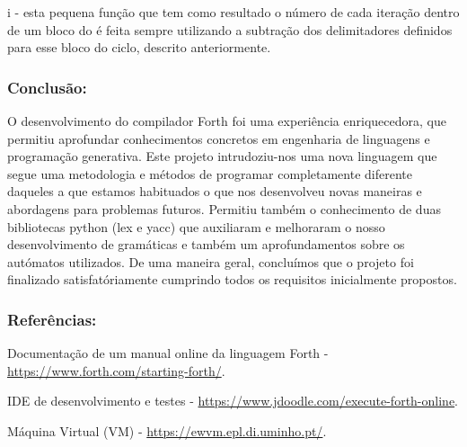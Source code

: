 \documentclass{article}
\begin{document}
    i - esta pequena função que tem como resultado o número de cada iteração dentro de um bloco do é feita sempre utilizando a subtração dos delimitadores definidos para esse bloco do ciclo, descrito anteriormente.
   
    \vspace{1cm}


\subsubsection*{Conclusão:}
    \vspace{0.5cm}

    O desenvolvimento do compilador Forth foi uma experiência enriquecedora, que permitiu aprofundar conhecimentos concretos em engenharia de linguagens e programação generativa. 
    Este projeto intrudoziu-nos uma nova linguagem que segue uma metodologia e 
    métodos de programar completamente diferente daqueles a que estamos habituados o que nos desenvolveu novas maneiras e abordagens para problemas futuros.
    Permitiu também o conhecimento de duas bibliotecas python (lex e yacc) que auxiliaram e melhoraram o nosso desenvolvimento de gramáticas e também um aprofundamentos sobre os autómatos utilizados.
    De uma maneira geral, concluímos que o projeto foi finalizado satisfatóriamente cumprindo todos os requisitos inicialmente propostos.
    
   
    \vspace{1cm}

\subsubsection*{Referências:}
    \vspace{0.5cm}

    Documentação de um manual online da linguagem Forth - \href{https://www.forth.com/starting-forth/}{https://www.forth.com/starting-forth/}.

    IDE de desenvolvimento e testes - \href{https://www.jdoodle.com/execute-forth-online}{https://www.jdoodle.com/execute-forth-online}.
    
    Máquina Virtual (VM) - \href{https://ewvm.epl.di.uminho.pt/}{https://ewvm.epl.di.uminho.pt/}.

    

    \vspace{1cm}
\end{document}
